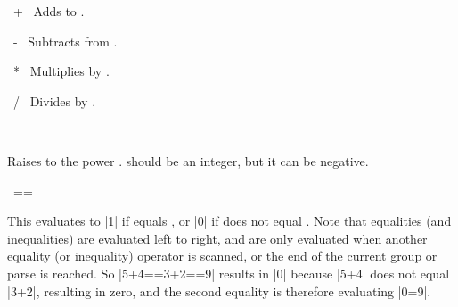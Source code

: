 \begin{math-operator}{\ +\ }
	Adds  to .
	
\begin{codeexample}[post=\tt\footnotesize\pgfmathresult]
\end{codeexample}
\end{math-operator}\begin{math-operator}{\ -\ }
	Subtracts  from  .
	
\begin{codeexample}[post=\tt\footnotesize\pgfmathresult]
\end{codeexample}
\end{math-operator}
\begin{math-operator}{\ *\ }
	Multiplies  by  .
	
\begin{codeexample}[post=\tt\footnotesize\pgfmathresult]
\end{codeexample}

\end{math-operator}
\begin{math-operator}{\ /\ }
	Divides  by  .
	
\begin{codeexample}[post=\tt\footnotesize\pgfmathresult]
\end{codeexample}

\end{math-operator}
\begin{math-operator}{\ {}\ } 

Raises  to the power .  should be an integer, but it can be negative.

\begin{codeexample}[post=\tt\footnotesize\pgfmathresult]
\end{codeexample}

\begin{codeexample}[post=\tt\footnotesize\pgfmathresult]
\end{codeexample}
\end{math-operator}

\begin{math-operator}{\ ==\ } 

	This evaluates to |1| if  equals , or |0| if 
	does not equal . 
	Note that equalities (and inequalities) are evaluated left to right, 
	and are only evaluated when another equality (or inequality) operator 
	is scanned, or the end of the current group or parse is reached. So 
	|5+4==3+2==9| results in |0| because |5+4| does not equal |3+2|, 
	resulting in zero, and the second equality is therefore evaluating 
	|0=9|.

\begin{codeexample}[post=\tt\footnotesize\pgfmathresult]
\end{codeexample}

\end{math-operator}


